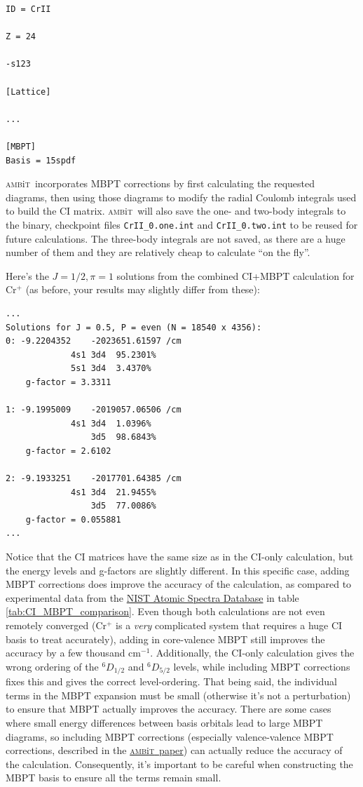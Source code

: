 \documentclass{report}
\newcommand{\ambit}{\textsc{amb}{\footnotesize i}\textsc{t}}
\begin{document}
\begin{verbatim}
ID = CrII

Z = 24

-s123

[Lattice]

...

[MBPT]
Basis = 15spdf
\end{verbatim}

\ambit\  incorporates MBPT corrections by first calculating the requested diagrams, then using those
diagrams to modify the radial Coulomb integrals used to build the CI matrix. \ambit\  will also save the
one- and two-body integrals to the binary, checkpoint files \texttt{CrII\_0.one.int} and
\texttt{CrII\_0.two.int} to be reused for future calculations. The three-body integrals are not saved,
as there are a huge number of them and they are relatively cheap to calculate ``on the fly''.

Here's the $J = 1/2, \pi = 1$ solutions from the combined CI+MBPT calculation for Cr$^+$ (as before, 
your results may slightly differ from these):

\begin{verbatim}
...
Solutions for J = 0.5, P = even (N = 18540 x 4356):
0: -9.2204352    -2023651.61597 /cm
             4s1 3d4  95.2301%
             5s1 3d4  3.4370%
    g-factor = 3.3311

1: -9.1995009    -2019057.06506 /cm
             4s1 3d4  1.0396%
                 3d5  98.6843%
    g-factor = 2.6102

2: -9.1933251    -2017701.64385 /cm
             4s1 3d4  21.9455%
                 3d5  77.0086%
    g-factor = 0.055881
...
\end{verbatim}

Notice that the CI matrices have the same size as in the CI-only calculation, but the energy levels and
g-factors are slightly different. In this specific case, adding MBPT corrections does improve the
accuracy of the calculation, as compared to experimental data from the 
\href{https://physics.nist.gov/PhysRefData/ASD/levels_form.html}{NIST Atomic Spectra Database} in table
\ref{tab:CI_MBPT_comparison}. Even though both calculations are not even remotely converged (Cr$^+$ is a
\emph{very} complicated system that requires a huge CI basis to treat accurately), adding in
core-valence MBPT still improves the accuracy by a few thousand cm$^{-1}$. Additionally,
the CI-only calculation gives the wrong ordering of the $^6D_{1/2}$ and $^6D_{5/2}$
levels, while including MBPT corrections fixes this and gives the correct level-ordering. That being
said, the individual terms in the MBPT expansion must be small (otherwise it's not a perturbation) to
ensure that MBPT actually improves the accuracy. There are some cases where small energy differences
between basis orbitals lead to large MBPT diagrams, so including MBPT corrections (especially
valence-valence MBPT corrections, described in the \href{https://arxiv.org/abs/1805.11265}
{\ambit\ paper}) can
actually reduce the accuracy of the calculation. Consequently, it's important to be careful when 
constructing the MBPT basis to ensure all the terms remain small.
\end{document}
